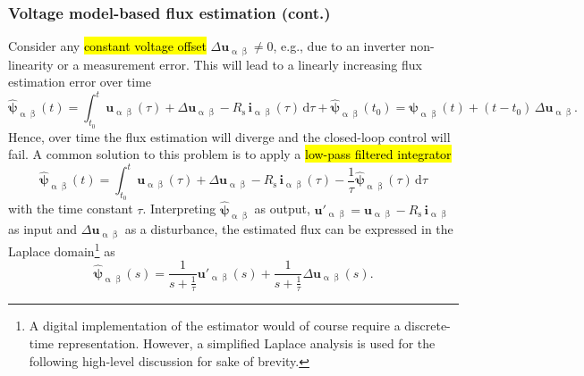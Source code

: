 \begin{frame}
    \frametitle{Voltage model-based flux estimation (cont.)}
    Consider any \hl{constant voltage offset} $\Delta \bm{u}_{\upalpha\upbeta}\neq 0$, e.g., due to an inverter non-linearity or a measurement error. \pause This will lead to a linearly increasing flux estimation error over time
    \begin{equation}
        \hat{\bm{\psi}}_{\upalpha\upbeta}(t) = \int_{t_0}^t \bm{u}_{\upalpha\upbeta}(\tau) + \Delta \bm{u}_{\upalpha\upbeta} - R_\mathrm{s}\,\bm{i}_{\upalpha\upbeta}(\tau) \, \mathrm{d}\tau + \hat{\bm{\psi}}_{\upalpha\upbeta}(t_0) = \bm{\psi}_{\upalpha\upbeta}(t) + (t-t_0)\,\Delta \bm{u}_{\upalpha\upbeta}.
    \end{equation}\pause%
    Hence, over time the flux estimation will diverge and the closed-loop control will fail. A common solution to this problem is to apply a \hl{low-pass filtered integrator}
    \begin{equation}
        \hat{\bm{\psi}}_{\upalpha\upbeta}(t) = \int_{t_0}^t \bm{u}_{\upalpha\upbeta}(\tau) + \Delta \bm{u}_{\upalpha\upbeta} - R_\mathrm{s}\,\bm{i}_{\upalpha\upbeta}(\tau) - \frac{1}{\tau}\hat{\bm{\psi}}_{\upalpha\upbeta}(\tau) \, \mathrm{d}\tau
    \end{equation}
    with the time constant $\tau$. \pause Interpreting $\hat{\bm{\psi}}_{\upalpha\upbeta}$ as output, $\bm{u}'_{\upalpha\upbeta}= \bm{u}_{\upalpha\upbeta} - R_\mathrm{s}\,\bm{i}_{\upalpha\upbeta}$ as input and $\Delta \bm{u}_{\upalpha\upbeta}$ as a disturbance, the estimated flux can be expressed in the Laplace domain\footnote{A digital implementation of the estimator would of course require a discrete-time representation. However, a simplified Laplace analysis is used for the following high-level discussion for sake of brevity.} as
    \begin{equation}
        \hat{\bm{\psi}}_{\upalpha\upbeta}(s) = \frac{1}{s + \frac{1}{\tau}}\bm{u}'_{\upalpha\upbeta}(s) + \frac{1}{s + \frac{1}{\tau}}\Delta \bm{u}_{\upalpha\upbeta}(s).
    \end{equation}
\end{frame}

